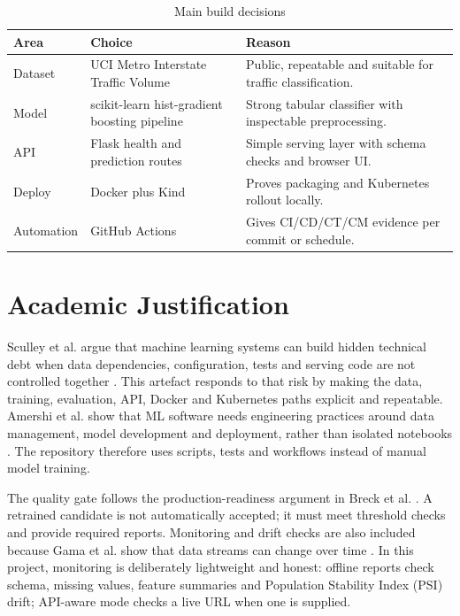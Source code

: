 \documentclass[journal,twoside,web]{ieeecolor}
\begin{document}
\begin{table}[!t]
\caption{Main build decisions}
\label{tab:approach}
\centering
\scriptsize
\renewcommand{\arraystretch}{1.12}
\begin{tabular}{|L{0.62in}|L{1.05in}|L{0.95in}|}
\hline
\textbf{Area} & \textbf{Choice} & \textbf{Reason} \\
\hline
Dataset & UCI Metro Interstate Traffic Volume & Public, repeatable and suitable for traffic classification. \\
\hline
Model & scikit-learn hist-gradient boosting pipeline & Strong tabular classifier with inspectable preprocessing. \\
\hline
API & Flask health and prediction routes & Simple serving layer with schema checks and browser UI. \\
\hline
Deploy & Docker plus Kind & Proves packaging and Kubernetes rollout locally. \\
\hline
Automation & GitHub Actions & Gives CI/CD/CT/CM evidence per commit or schedule. \\
\hline
\end{tabular}
\end{table}

\section{Academic Justification}
Sculley et al. argue that machine learning systems can build hidden technical debt when data dependencies, configuration, tests and serving code are not controlled together \cite{sculley}. This artefact responds to that risk by making the data, training, evaluation, API, Docker and Kubernetes paths explicit and repeatable. Amershi et al. show that ML software needs engineering practices around data management, model development and deployment, rather than isolated notebooks \cite{amershi}. The repository therefore uses scripts, tests and workflows instead of manual model training.

The quality gate follows the production-readiness argument in Breck et al. \cite{breck}. A retrained candidate is not automatically accepted; it must meet threshold checks and provide required reports. Monitoring and drift checks are also included because Gama et al. show that data streams can change over time \cite{gama}. In this project, monitoring is deliberately lightweight and honest: offline reports check schema, missing values, feature summaries and Population Stability Index (PSI) drift; API-aware mode checks a live URL when one is supplied.
\end{document}
